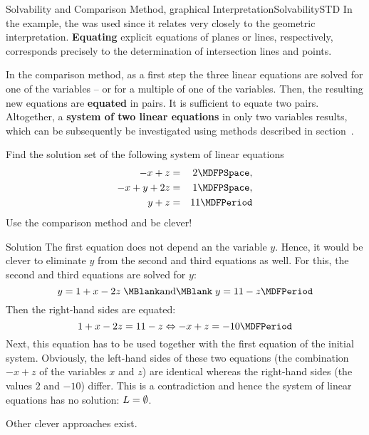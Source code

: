 \begin{MXContent}{Solvability and Comparison Method, graphical Interpretation}{Solvability}{STD}
In the example, the 
was used since it relates very closely to the geometric interpretation. \textbf{Equating}
explicit equations of planes or lines, respectively, corresponds precisely to the determination
of intersection lines and points.
 
\begin{MInfo}
In the comparison method, as a first step the three linear equations are solved for 
one of the variables -- or for a multiple of one of the variables. Then, the resulting 
new equations are \textbf{equated} in pairs. It is sufficient to equate two pairs.  
Altogether, a \textbf{system of two linear equations} in only two variables results,
which can be subsequently be investigated using methods described in 
section~.
\end{MInfo}

\begin{MExercise}
Find the solution set of the following system of linear equations
\begin{eqnarray*}
- x + z & = & 2 \MDFPSpace, \\ - x + y + 2 z & = & 1 \MDFPSpace, \\ y + z & = & 11 \MDFPeriod
\end{eqnarray*}
Use the comparison method and be clever!

\begin{MHint}{Solution}
The first equation does not depend an the variable $y$. Hence, it would
be clever to eliminate $y$ from the second and third equations as well. 
For this, the second and third equations are solved for $y$:
$$y = 1 + x - 2 z \; \MBlank\mbox{and}\MBlank \; y = 11 - z \MDFPeriod $$
Then the right-hand sides are equated:
$$1 + x - 2 z = 11 - z \Leftrightarrow - x + z = - 10 \MDFPeriod $$
Next, this equation has to be used together with the first equation of the initial system. 
Obviously, the left-hand sides of these two equations (the combination $- x + z$ of 
the variables $x$ and $z$) are identical whereas the right-hand sides 
(the values $2$ and $-10$) differ. This is a contradiction and hence the system
of linear equations has no solution: ${L} = \emptyset$.

Other clever approaches exist.
\end{MHint}
\end{MExercise}
\end{MXContent}

